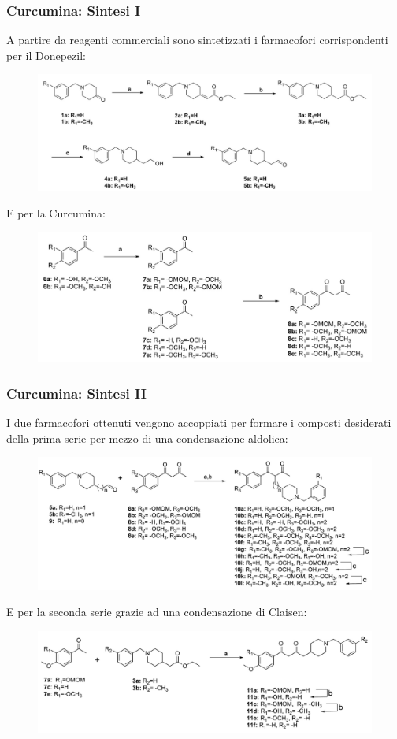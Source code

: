 \documentclass[9pt]{beamer}
\begin{document}
\begin{frame}
	\frametitle{Curcumina: Sintesi I}
	A partire da reagenti commerciali sono sintetizzati i farmacofori corrispondenti per il Donepezil:
	\begin{figure}
		\includegraphics[width=.6\textwidth]{immagini/farmadone_curcdone.png}
	\end{figure}
	E per la Curcumina:
	\begin{figure}
		\includegraphics[width=.6\textwidth]{immagini/farmacurc_curcdone.png}
	\end{figure}
\end{frame}

\begin{frame}
	\frametitle{Curcumina: Sintesi II}
	I due farmacofori ottenuti vengono accoppiati per formare i composti desiderati della prima serie per mezzo di una condensazione aldolica:
	\begin{figure}
		\includegraphics[width=.6\textwidth]{immagini/condserie1_curcdone.png}
	\end{figure}
	E per la seconda serie grazie ad una condensazione di Claisen:
	\begin{figure}
		\includegraphics[width=.6\textwidth]{immagini/condserie2_curcdone.png}
	\end{figure}
\end{frame}
\end{document}
